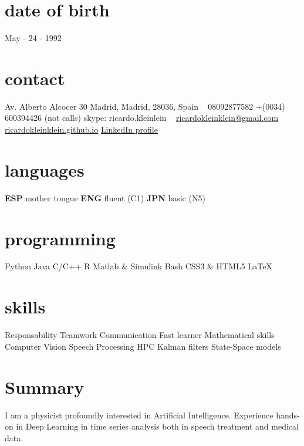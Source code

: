 \documentclass[]{friggeri-cv-a4}
\begin{document}


\begin{aside} %
\section{date of birth}
May - 24 - 1992
\section{contact}
Av. Alberto Alcocer 30
Madrid, Madrid, 28036,
Spain
~
08092877582
+(0034) 600394426 (not calls)
skype: ricardo.kleinlein
~
{\scriptsize \href{mailto:ricardokleinklein@gmail.com}{ricardokleinklein@gmail.com} }
{\scriptsize \href{https://ricardokleinklein.github.io}{ricardokleinklein.github.io} }
{\small \href{https://www.linkedin.com/in/rfaundezcarrasco}{LinkedIn profile} }
\section{languages}
\textbf{ESP} mother tongue
\textbf{ENG} fluent (C1)
\textbf{JPN} basic (N5)
\section{programming}
Python
Java
C/C++
R
Matlab \& Simulink
Bash
CSS3 \& HTML5
\LaTeX
\section{skills}
Responsability
Teamwork
Communication
Fast learner
Mathematical skills
Computer Vision
Speech Processing
HPC
Kalman filters
State-Space models
\end{aside}

\section{Summary}
I am a physicist profoundly interested in Artificial Intelligence. Experience hands-on in Deep Learning in time series analysis both in speech treatment and medical data.
\end{document}
